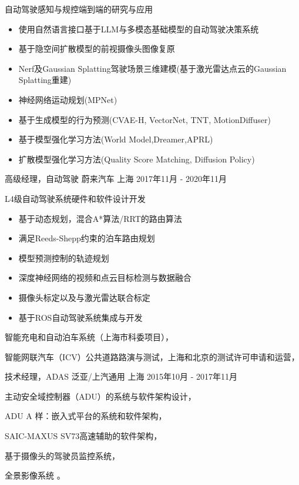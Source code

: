 \documentclass[../cv_cn.tex]{subfiles}
\begin{document}
\begin{cventries}
{\begin{cvitems}
\begin{itemize}
			\end{itemize}
			\item 自动驾驶感知与规控端到端的研究与应用
			\begin{itemize}
				\item 使用自然语言接口基于LLM与多模态基础模型的自动驾驶决策系统 \supercite{Xin_LLM_24} \supercite{Xin_VLM_24}
				\item 基于隐空间扩散模型的前视摄像头图像复原\supercite{Xin_Latent_Diffusion_23}
				\item Nerf及Gaussian Splatting驾驶场景三维建模(基于激光雷达点云的Gaussian Splatting重建)
				\item 神经网络运动规划(MPNet)
				\item 基于生成模型的行为预测(CVAE-H, VectorNet, TNT, MotionDiffuser)
				\item 基于模型强化学习方法(World Model,Dreamer,APRL)
				\item 扩散模型强化学习方法(Quality Score Matching, Diffusion Policy)
			\end{itemize}
		\end{cvitems}
	}

	\cventry
	{高级经理，自动驾驶} %
	{蔚来汽车} %
	{上海} %
	{2017年11月 - 2020年11月} %
	{
		\begin{cvitems}
			\item L4级自动驾驶系统硬件和软件设计开发
			\begin{itemize}
				\item 基于动态规划，混合A*算法/RRT的路由算法
				\item 满足Reeds-Shepp约束的泊车路由规划
				\item 模型预测控制的轨迹规划
				\item 深度神经网络的视频和点云目标检测与数据融合
				\item 摄像头标定以及与激光雷达联合标定
				\item 基于ROS自动驾驶系统集成与开发
			\end{itemize}
			\item 智能充电和自动泊车系统（上海市科委项目），
			\item 智能网联汽车（ICV）公共道路路演与测试，上海和北京的测试许可申请和运营，
		\end{cvitems}
	}

	\cventry
	{技术经理，ADAS} %
	{泛亚/上汽通用} %
	{上海} %
	{2015年10月 - 2017年11月} %
	{
		\begin{cvitems}
			\item 主动安全域控制器（ADU）的系统与软件架构设计，
			\item ADU A 样：嵌入式平台的系统和软件架构，
			\item SAIC-MAXUS SV73高速辅助的软件架构，
			\item 基于摄像头的驾驶员监控系统，
			\item 全景影像系统 \supercite{Xin_RearView_17}。
		\end{cvitems}
	}



\end{cventries}
\end{document}
